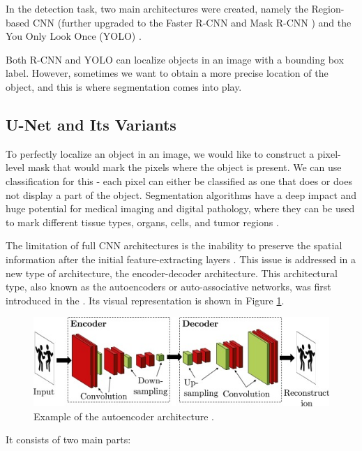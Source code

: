 In the detection task, two main architectures were created, namely the Region-based CNN \cite{Girshick2014} (further upgraded to the Faster R-CNN and Mask R-CNN \cite{Ren2017}) and the You Only Look Once (YOLO) \cite{He2017}. 

Both R-CNN and YOLO can localize objects in an image with a bounding box label. However, sometimes we want to obtain a more precise location of the object, and this is where segmentation comes into play.

\subsection{U-Net and Its Variants}
To perfectly localize an object in an image, we would like to construct a pixel-level mask that would mark the pixels where the object is present. We can use classification for this - each pixel can either be classified as one that does or does not display a part of the object. Segmentation algorithms have a deep impact and huge potential for medical imaging and digital pathology, where they can be used to mark different tissue types, organs, cells, and tumor regions \cite{Santosh2022-3}.

The limitation of full CNN architectures is the inability to preserve the spatial information after the initial feature-extracting layers \cite{Santosh2022-3}. This issue is addressed in a new type of architecture, the encoder-decoder architecture. This architectural type, also known as the autoencoders or auto-associative networks, was first introduced in the \cite{Kramer1992}. Its visual representation is shown in Figure \ref{fig:autoencoder}.

\begin{figure}[H]
\begin{centering}
\includegraphics[width=12cm]{assets/images/encoder-decoder.jpg}
\par\end{centering}
\caption{Example of the autoencoder architecture \cite{Santosh2022-2}.}
\label{fig:autoencoder}
\end{figure}

It consists of two main parts:

